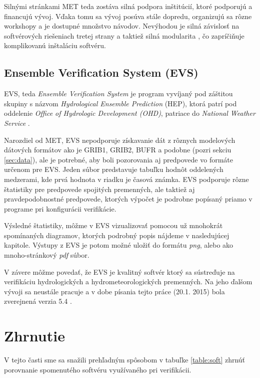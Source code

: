Silnými stránkami MET teda zostáva silná podpora inštitúcií, ktoré podporujú a financujú vývoj. Vďaka tomu sa vývoj posúva stále dopredu, organizujú sa rôzne workshopy a je dostupné množstvo návodov. Nevýhodou je silná závislosť na softvérových riešeniach tretej strany a taktiež silná modularita , čo zapríčiňuje komplikovanú inštaláciu softvéru.

\subsection[EVS]{Ensemble Verification System (EVS)}
EVS, teda \textit{Ensemble Verification System} \cite{EVS} je program vyvíjaný pod záštitou skupiny s názvom \textit{Hydrological Ensemble Prediction} (HEP), ktorá patrí pod oddelenie \textit{Office of Hydrologic Development (OHD)}, patriace do \textit{National Weather Service} \cite{EVSmanual}.

Narozdiel od MET, EVS nepodporuje získavanie dát z rôznych modelových dátových formátov ako je GRIB1, GRIB2, BUFR a podobne (pozri sekciu \ref{sec:data}), ale je potrebné, aby boli pozorovania aj predpovede vo formáte určenom pre EVS. Jeden súbor predstavuje tabuľku hodnôt oddelených medzerami, kde prvá hodnota v riadku je časová známka. EVS podporuje rôzne štatistiky pre predpovede spojitých premenných, ale taktiež aj pravdepodobnostné predpovede, ktorých výpočet je podrobne popísaný priamo v programe pri konfigurácii verifikácie.

Výsledné štatistiky, môžme v EVS vizualizovať pomocou už mnohokrát spomínaných diagramov, ktorých podrobný popis nájdeme v nasledujúcej kapitole. Výstupy z EVS je potom možné uložiť do formátu \textit{png}, alebo ako mnoho-stránkový \textit{pdf} súbor.

V závere môžme povedať, že EVS je kvalitný softvér ktorý sa sústreďuje na verifikáciu hydrologických a hydrometeorologických premenných. Na jeho ďalšom vývoji sa neustále pracuje a v dobe písania tejto práce (20.1. 2015) bola zverejnená verzia 5.4 \cite{EVS}.



\section{Zhrnutie}
V tejto časti sme sa snažili prehľadným spôsobom v tabuľke \ref{table:soft} zhrnúť porovnanie spomenutého softvéru využívaného pri verifikácii.



